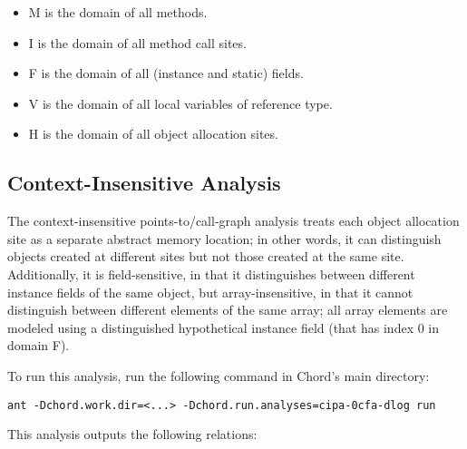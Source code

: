 \texonly{\newpage}

\begin{itemize}
\item M is the domain of all methods.
\item I is the domain of all method call sites.
\item F is the domain of all (instance and static) fields.
\item V is the domain of all local variables of reference type.
\item H is the domain of all object allocation sites.
\end{itemize}

\subsection{Context-Insensitive Analysis}

The context-insensitive points-to/call-graph analysis 
treats each object allocation site as a separate abstract memory location; in other words, it
can distinguish objects created at different sites but not those created at the same site.
Additionally, it is field-sensitive, in that it distinguishes between different instance fields of the same object,
but array-insensitive, in that it cannot distinguish between different elements of the same array;
all array elements are modeled using a distinguished hypothetical instance field (that has index 0 in domain F).

To run this analysis, run the following command in Chord's main directory:

\begin{framed}
\begin{verbatim}
ant -Dchord.work.dir=<...> -Dchord.run.analyses=cipa-0cfa-dlog run
\end{verbatim}
\end{framed}

This analysis outputs the following relations:



